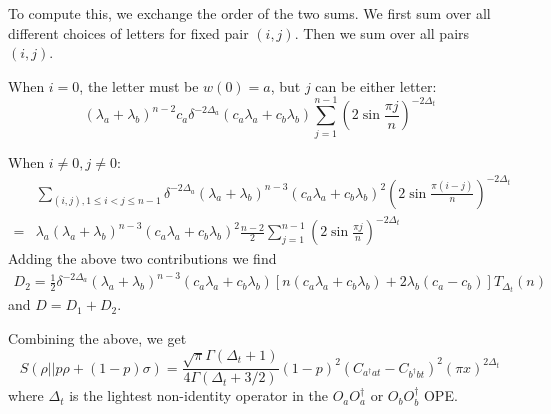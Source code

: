 \documentclass{article}
\theoremstyle{plain}
\theoremstyle{definition}
\theoremstyle{plain}
\begin{document}
To compute this, we exchange the order of the two sums. We first sum over all different choices of letters for fixed pair $(i,j)$. Then we sum over all pairs $(i,j)$.

When $i=0$, the letter must be $w(0)=a$, but $j$ can be either letter:
\begin{equation}
(\lambda_a+\lambda_b)^{n-2} c_a \delta^{-2\Delta_a} (c_a \lambda_a+c_b \lambda_b)  \sum_{j=1}^{n-1}  (2\sin \frac{\pi j}{n})^{-2\Delta_t}
\end{equation}

When $i\neq 0,j\neq 0$:
\begin{equation}
\begin{aligned}
    &\sum_{(i,j),1\leq i<j\leq n-1} \delta^{-2\Delta_a} (\lambda_a+\lambda_b)^{n-3}  (c_a \lambda_a+c_b \lambda_b)^2 (2\sin \frac{\pi (i-j)}{n})^{-2\Delta_t} \\
    =& \lambda_a (\lambda_a+\lambda_b)^{n-3}  (c_a \lambda_a+c_b \lambda_b)^2 \frac{n-2}{2} \sum_{j=1}^{n-1}  (2\sin \frac{\pi j}{n})^{-2\Delta_t}
\end{aligned}
\end{equation}
Adding the above two contributions we find
\begin{equation}
\begin{aligned}
    D_2=\frac{1}{2}\delta^{-2\Delta_a} (\lambda_a+\lambda_b)^{n-3}(c_a \lambda_a+c_b \lambda_b)\left[ n (c_a \lambda_a+c_b \lambda_b) +2\lambda_b (c_a-c_b)\right] T_{\Delta_t}(n) 
\end{aligned}
\end{equation}
and $D=D_1+D_2$.

Combining the above, we get
\begin{equation}
  \boxed{S(\rho||p\rho+(1-p)\sigma)=\frac{\sqrt{\pi}\Gamma(\Delta_t+1)}{4\Gamma(\Delta_t+3/2)}(1-p)^2 (C_{a^\dagger at}-C_{b^\dagger bt})^2 (\pi x)^{2\Delta_t}}
\end{equation}
where $\Delta_t$ is the lightest non-identity operator in the $O_a O_a^\dagger$ or $O_b O_b^\dagger$ OPE.
\end{document}
